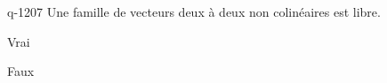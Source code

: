 \begin{truefalse}{q-1207}
Une famille de vecteurs deux à deux non colinéaires est libre.
\item Vrai
\item* Faux
\end{truefalse}

